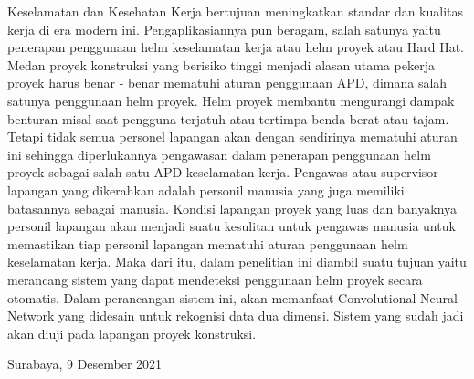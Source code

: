 Keselamatan dan Kesehatan Kerja bertujuan meningkatkan standar dan kualitas kerja 
di era modern ini. Pengaplikasiannya pun beragam, salah satunya yaitu penerapan penggunaan 
helm keselamatan kerja atau helm proyek atau Hard Hat. Medan proyek konstruksi yang berisiko 
tinggi menjadi alasan utama pekerja proyek harus benar - benar mematuhi aturan penggunaan APD, 
dimana salah satunya penggunaan helm proyek. Helm proyek membantu mengurangi dampak benturan 
misal saat pengguna terjatuh atau tertimpa benda berat atau tajam. Tetapi tidak semua personel 
lapangan akan dengan sendirinya mematuhi aturan ini sehingga diperlukannya pengawasan dalam 
penerapan penggunaan helm proyek sebagai salah satu APD keselamatan kerja. Pengawas atau 
supervisor lapangan yang dikerahkan adalah personil manusia yang juga memiliki batasannya 
sebagai manusia. Kondisi lapangan proyek yang luas dan banyaknya personil lapangan akan 
menjadi suatu kesulitan untuk pengawas manusia untuk memastikan tiap personil lapangan 
mematuhi aturan penggunaan helm keselamatan kerja. Maka dari itu, dalam penelitian ini diambil 
suatu tujuan yaitu merancang sistem yang dapat mendeteksi penggunaan helm proyek secara otomatis. Dalam perancangan sistem ini, akan memanfaat Convolutional Neural Network yang didesain untuk rekognisi data dua dimensi. Sistem yang sudah jadi akan diuji pada lapangan proyek konstruksi.
\vspace{1ex}

\begin{flushright}
  Surabaya, 9 Desember 2021
\end{flushright}
\vspace{1ex}

